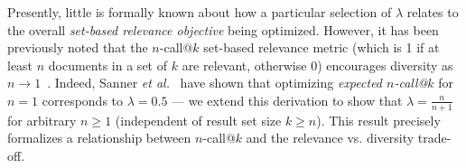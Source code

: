 Presently, little is formally known about how a particular selection
of $\lambda$ relates to the overall \emph{set-based relevance objective}
being optimized.  However, it has been previously noted that the
$n$-call@$k$ set-based relevance metric (which is 1 if at least $n$
documents in a set of $k$ are relevant, otherwise 0) encourages
diversity as $n \to 1$~\cite{chen06Less,wang09PortfolioTheory}.
Indeed, Sanner \emph{et al.} \cite{sanner11}~have shown that optimizing
\emph{expected $n$-call@$k$} for $n=1$ corresponds to 
$\lambda = 0.5$ --- we extend
this derivation to show that $\lambda = \frac{n}{n+1}$ 
for arbitrary $n \geq 1$ 
(independent of result set size $k \geq
n$).  This result precisely formalizes a relationship
between $n$-call@$k$ and the relevance vs. diversity
trade-off.
